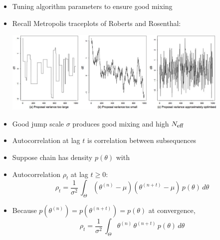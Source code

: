 \documentclass[10pt]{report}
\begin{document}
\begin{itemize}
\item Tuning algorithm parameters to ensure good mixing
\item Recall Metropolis traceplots of Roberts and Rosenthal:
\begin{center}
\includegraphics[width=0.85\textwidth]{img/roberts-rosenthal-traceplots.jpg}
\end{center}
\item Good jump scale $\sigma$ produces good mixing and high
$N_{\mbox{\footnotesize eff}}$
\end{itemize}


%
\begin{itemize}
\item Autocorrelation at lag $t$ is correlation between subsequences
\item  Suppose chain has density $p(\theta)$ with
\item Autocorrelation $\rho_t$ at lag $t \geq 0$:
\[
\rho_t  =  \frac{1}{\sigma^2} \, \int_{\Theta} (\theta^{(n)} - \mu)
       (\theta^{(n+t)} - \mu) \, p(\theta) \, d\theta
\]
\item Because $p(\theta^{(n)}) = p(\theta^{(n+t)}) = p(\theta)$ at convergence,
\[
\rho_t = \frac{1}{\sigma^2} \, \int_{\Theta} \theta^{(n)} \, \theta^{(n+t)} \, p(\theta) \, d\theta
\]
\end{itemize}
\end{document}
